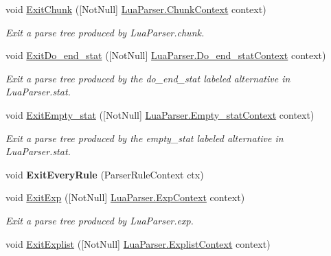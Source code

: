 \begin{DoxyCompactItemize}
void \mbox{\hyperlink{classzlua_1_1_compiler_a1f313aa9552acb3fa730ac091a4fa17d}{Exit\+Chunk}} (\mbox{[}Not\+Null\mbox{]} \mbox{\hyperlink{classzlua_1_1_lua_parser_1_1_chunk_context}{Lua\+Parser.\+Chunk\+Context}} context)
\begin{DoxyCompactList}\small\item\em Exit a parse tree produced by Lua\+Parser.\+chunk. \end{DoxyCompactList}\item 
void \mbox{\hyperlink{classzlua_1_1_compiler_aaad82853d1a4a26480b3ae56adbc58f6}{Exit\+Do\+\_\+end\+\_\+stat}} (\mbox{[}Not\+Null\mbox{]} \mbox{\hyperlink{classzlua_1_1_lua_parser_1_1_do__end__stat_context}{Lua\+Parser.\+Do\+\_\+end\+\_\+stat\+Context}} context)
\begin{DoxyCompactList}\small\item\em Exit a parse tree produced by the {\ttfamily do\+\_\+end\+\_\+stat} labeled alternative in Lua\+Parser.\+stat. \end{DoxyCompactList}\item 
void \mbox{\hyperlink{classzlua_1_1_compiler_a6e35167b78ef83dd011df22f00c919a9}{Exit\+Empty\+\_\+stat}} (\mbox{[}Not\+Null\mbox{]} \mbox{\hyperlink{classzlua_1_1_lua_parser_1_1_empty__stat_context}{Lua\+Parser.\+Empty\+\_\+stat\+Context}} context)
\begin{DoxyCompactList}\small\item\em Exit a parse tree produced by the {\ttfamily empty\+\_\+stat} labeled alternative in Lua\+Parser.\+stat. \end{DoxyCompactList}\item 
\mbox{\label{classzlua_1_1_compiler_ac0666696d34abc866e65101d6c7484e8}} 
void {\bfseries Exit\+Every\+Rule} (Parser\+Rule\+Context ctx)
\item 
void \mbox{\hyperlink{classzlua_1_1_compiler_afab9279bd386382fb1fa91044f5b8e71}{Exit\+Exp}} (\mbox{[}Not\+Null\mbox{]} \mbox{\hyperlink{classzlua_1_1_lua_parser_1_1_exp_context}{Lua\+Parser.\+Exp\+Context}} context)
\begin{DoxyCompactList}\small\item\em Exit a parse tree produced by Lua\+Parser.\+exp. \end{DoxyCompactList}\item 
void \mbox{\hyperlink{classzlua_1_1_compiler_a54d71e09af5891553fa884334ce40a14}{Exit\+Explist}} (\mbox{[}Not\+Null\mbox{]} \mbox{\hyperlink{classzlua_1_1_lua_parser_1_1_explist_context}{Lua\+Parser.\+Explist\+Context}} context)

\end{DoxyCompactItemize}
